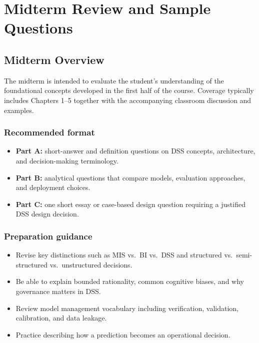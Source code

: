 
\chapter{Midterm Review and Sample Questions}
\label{ch:midterm-review-and-sample-questions}
\section*{Midterm Overview}

The midterm is intended to evaluate the student’s understanding of the
foundational concepts developed in the first half of the course. Coverage
typically includes Chapters 1--5 together with the accompanying classroom
discussion and examples.

\subsection*{Recommended format}
\begin{itemize}
  \item \textbf{Part A:} short-answer and definition questions on DSS concepts,
  architecture, and decision-making terminology.
  \item \textbf{Part B:} analytical questions that compare models, evaluation
  approaches, and deployment choices.
  \item \textbf{Part C:} one short essay or case-based design question requiring
  a justified DSS design decision.
\end{itemize}

\subsection*{Preparation guidance}
\begin{itemize}
  \item Revise key distinctions such as MIS vs.\ BI vs.\ DSS and structured vs.\
  semi-structured vs.\ unstructured decisions.
  \item Be able to explain bounded rationality, common cognitive biases, and why
  governance matters in DSS.
  \item Review model management vocabulary including verification, validation,
  calibration, and data leakage.
  \item Practice describing how a prediction becomes an operational decision.
\end{itemize}

